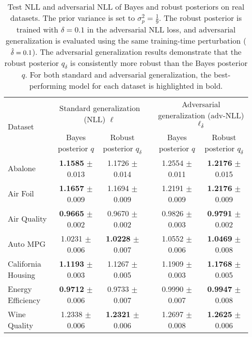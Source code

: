 \begin{table*}[h]
    \centering
    \begin{tabular}{lccccc}
    \toprule
    \multirow{2}{*}{Dataset}  %
       & \multicolumn{2}{c}{Standard generalization (NLL) $\ell$} & \phantom{}& \multicolumn{2}{c}{Adversarial generalization (adv-NLL) $\ell_{\hat{\delta}}$} \\
       & Bayes posterior $q$  & Robust posterior  $q_{\delta}$ & \phantom{}& Bayes posterior $q$ & Robust posterior $q_{\delta}$  \\
       \midrule
       Abalone & \textbf{1.1585} \tiny{$\pm$ 0.013} & 1.1726 \tiny{$\pm$ 0.014} && 1.2554 \tiny{$\pm$ 0.011} & \textbf{1.2176} \tiny{$\pm$ 0.015} \\
       Air Foil & \textbf{1.1657} \tiny{$\pm$ 0.009} & 1.1694 \tiny{$\pm$ 0.009} && 1.2191 \tiny{$\pm$ 0.009} & \textbf{1.2176} \tiny{$\pm$ 0.009} \\
       Air Quality & \textbf{0.9665} \tiny{$\pm$ 0.002} & 0.9670 \tiny{$\pm$ 0.002} && 0.9826 \tiny{$\pm$ 0.003} & \textbf{0.9791} \tiny{$\pm$ 0.002} \\
       Auto MPG & 1.0231 \tiny{$\pm$ 0.006} & \textbf{1.0228} \tiny{$\pm$ 0.007} && 1.0552 \tiny{$\pm$ 0.006} & \textbf{1.0469} \tiny{$\pm$ 0.008} \\
       California Housing & \textbf{1.1193} \tiny{$\pm$ 0.003} & 1.1267 \tiny{$\pm$ 0.005} && 1.1909 \tiny{$\pm$ 0.003} & \textbf{1.1768} \tiny{$\pm$ 0.005} \\
       Energy Efficiency & \textbf{0.9712} \tiny{$\pm$ 0.006} & 0.9733 \tiny{$\pm$ 0.007} && 0.9990 \tiny{$\pm$ 0.007} & \textbf{0.9947} \tiny{$\pm$ 0.008} \\
       Wine Quality & 1.2338 \tiny{$\pm$ 0.006} & \textbf{1.2321} \tiny{$\pm$ 0.006} && 1.2697 \tiny{$\pm$ 0.008} & \textbf{1.2625} \tiny{$\pm$ 0.006} \\
       \bottomrule
    \end{tabular}
    \caption{Test NLL and adversarial NLL of Bayes and robust posteriors on real datasets. The prior variance is set to $\sigma_p^2 = \frac{1}{9}$. The robust posterior is trained with $\delta=0.1$ in the adversarial NLL loss, and adversarial generalization is evaluated using the same training-time perturbation ($\hat{\delta}=0.1$). The adversarial generalization results demonstrate that the robust posterior $q_\delta$ is consistently more robust than the Bayes posterior $q$. For both standard and adversarial generalization, the best-performing model for each dataset is highlighted in bold.
    }
    \label{tab:real_data_p9}
\end{table*}

